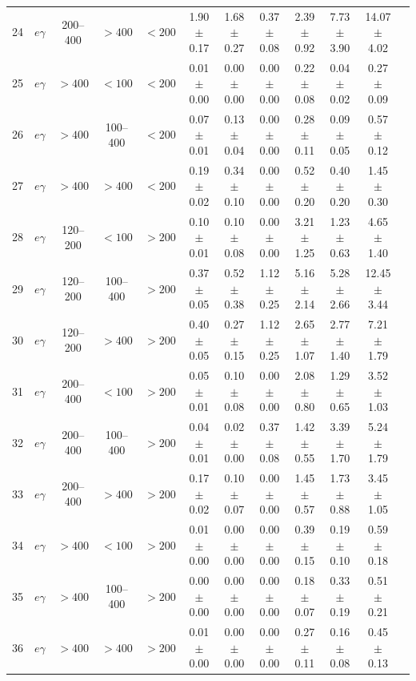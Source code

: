\begin{table}[htbp]
{\begin{tabular}{|c|c|c|c|c|c|c|c|c|c|c|c|}
24 & $e\gamma$ & 200--400 & $>400$ & $<200$ & 1.90 $\pm$ 0.17 & 1.68 $\pm$ 0.27 & 0.37 $\pm$ 0.08 & 2.39 $\pm$ 0.92 & 7.73 $\pm$ 3.90 & 14.07 $\pm$ 4.02 &  \\
25 & $e\gamma$ & $>400$ & $<100$ & $<200$ & 0.01 $\pm$ 0.00 & 0.00 $\pm$ 0.00 & 0.00 $\pm$ 0.00 & 0.22 $\pm$ 0.08 & 0.04 $\pm$ 0.02 & 0.27 $\pm$ 0.09 &  \\
26 & $e\gamma$ & $>400$ & 100--400 & $<200$ & 0.07 $\pm$ 0.01 & 0.13 $\pm$ 0.04 & 0.00 $\pm$ 0.00 & 0.28 $\pm$ 0.11 & 0.09 $\pm$ 0.05 & 0.57 $\pm$ 0.12 &  \\
27 & $e\gamma$ & $>400$ & $>400$ & $<200$ & 0.19 $\pm$ 0.02 & 0.34 $\pm$ 0.10 & 0.00 $\pm$ 0.00 & 0.52 $\pm$ 0.20 & 0.40 $\pm$ 0.20 & 1.45 $\pm$ 0.30 &  \\
28 & $e\gamma$ & 120--200 & $<100$ & $>200$ & 0.10 $\pm$ 0.01 & 0.10 $\pm$ 0.08 & 0.00 $\pm$ 0.00 & 3.21 $\pm$ 1.25 & 1.23 $\pm$ 0.63 & 4.65 $\pm$ 1.40 &  \\
29 & $e\gamma$ & 120--200 & 100--400 & $>200$ & 0.37 $\pm$ 0.05 & 0.52 $\pm$ 0.38 & 1.12 $\pm$ 0.25 & 5.16 $\pm$ 2.14 & 5.28 $\pm$ 2.66 & 12.45 $\pm$ 3.44 &  \\
30 & $e\gamma$ & 120--200 & $>400$ & $>200$ & 0.40 $\pm$ 0.05 & 0.27 $\pm$ 0.15 & 1.12 $\pm$ 0.25 & 2.65 $\pm$ 1.07 & 2.77 $\pm$ 1.40 & 7.21 $\pm$ 1.79 &  \\
31 & $e\gamma$ & 200--400 & $<100$ & $>200$ & 0.05 $\pm$ 0.01 & 0.10 $\pm$ 0.08 & 0.00 $\pm$ 0.00 & 2.08 $\pm$ 0.80 & 1.29 $\pm$ 0.65 & 3.52 $\pm$ 1.03 &  \\
32 & $e\gamma$ & 200--400 & 100--400 & $>200$ & 0.04 $\pm$ 0.01 & 0.02 $\pm$ 0.00 & 0.37 $\pm$ 0.08 & 1.42 $\pm$ 0.55 & 3.39 $\pm$ 1.70 & 5.24 $\pm$ 1.79 &  \\
33 & $e\gamma$ & 200--400 & $>400$ & $>200$ & 0.17 $\pm$ 0.02 & 0.10 $\pm$ 0.07 & 0.00 $\pm$ 0.00 & 1.45 $\pm$ 0.57 & 1.73 $\pm$ 0.88 & 3.45 $\pm$ 1.05 &  \\
34 & $e\gamma$ & $>400$ & $<100$ & $>200$ & 0.01 $\pm$ 0.00 & 0.00 $\pm$ 0.00 & 0.00 $\pm$ 0.00 & 0.39 $\pm$ 0.15 & 0.19 $\pm$ 0.10 & 0.59 $\pm$ 0.18 &  \\
35 & $e\gamma$ & $>400$ & 100--400 & $>200$ & 0.00 $\pm$ 0.00 & 0.00 $\pm$ 0.00 & 0.00 $\pm$ 0.00 & 0.18 $\pm$ 0.07 & 0.33 $\pm$ 0.19 & 0.51 $\pm$ 0.21 &  \\
36 & $e\gamma$ & $>400$ & $>400$ & $>200$ & 0.01 $\pm$ 0.00 & 0.00 $\pm$ 0.00 & 0.00 $\pm$ 0.00 & 0.27 $\pm$ 0.11 & 0.16 $\pm$ 0.08 & 0.45 $\pm$ 0.13 &  \\
\hline
\end{tabular}}
\end{table}
